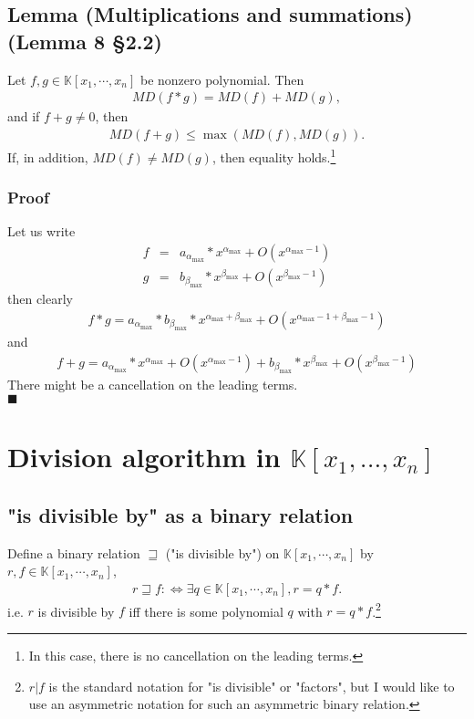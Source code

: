 \documentclass[11pt]{book}
\begin{document}
\subsection{Lemma (Multiplications and summations) (Lemma 8 \S2.2)}
\label{multiplication}
Let $f, g \in \mathbb{K}[x_1, \cdots, x_n]$ be nonzero polynomial.
Then
\begin{eqnarray}
MD(f * g) = MD(f) + MD(g),
\end{eqnarray}
and if $f+g \neq 0$, then
\begin{eqnarray}
MD(f+g) \leq \max(MD(f), MD(g)).
\end{eqnarray}
If, in addition, $MD(f) \neq MD(g)$, then equality holds.\footnote{In this case, there is no cancellation on the leading terms.}

\subsubsection{Proof}
Let us write
\begin{eqnarray}
f &=& a_{\alpha_{\max}} * x^{\alpha_{\max}} + O(x^{\alpha_{\max}-1}) \\
g &=& b_{\beta_{\max}} * x^{\beta_{\max}} + O(x^{\beta_{\max}-1})
\end{eqnarray}
then clearly
\begin{eqnarray}
f*g = a_{\alpha_{\max}} * b_{\beta_{\max}} * x^{\alpha_{\max}+\beta_{\max}} + O(x^{\alpha_{\max}-1+\beta_{\max} -1})
\end{eqnarray}
and
\begin{eqnarray}
f + g =  a_{\alpha_{\max}} * x^{\alpha_{\max}} + O(x^{\alpha_{\max}-1}) + b_{\beta_{\max}} * x^{\beta_{\max}} + O(x^{\beta_{\max}-1}) 
\end{eqnarray}
There might be a cancellation on the leading terms.\\
$\blacksquare$

\section{Division algorithm in $\mathbb{K}[x_1, ... , x_n]$}
\subsection{"is divisible by" as a binary relation}
\label{isDivisibleBy}
Define a binary relation $\sqsupseteq$ ("is divisible by") on $\mathbb{K}[x_1, \cdots, x_n]$ by $r,f \in \mathbb{K}[x_1, \cdots, x_n]$,
\begin{eqnarray}
r \sqsupseteq f :\Leftrightarrow \exists q \in \mathbb{K}[x_1, \cdots, x_n], r = q*f.
\end{eqnarray}
i.e. $r$ is divisible by $f$ iff there is some polynomial $q$ with $r = q*f$.\footnote{$r|f$ is the standard notation for "is divisible" or "factors", but I would like to use an asymmetric notation for such an asymmetric binary relation.}
\end{document}
